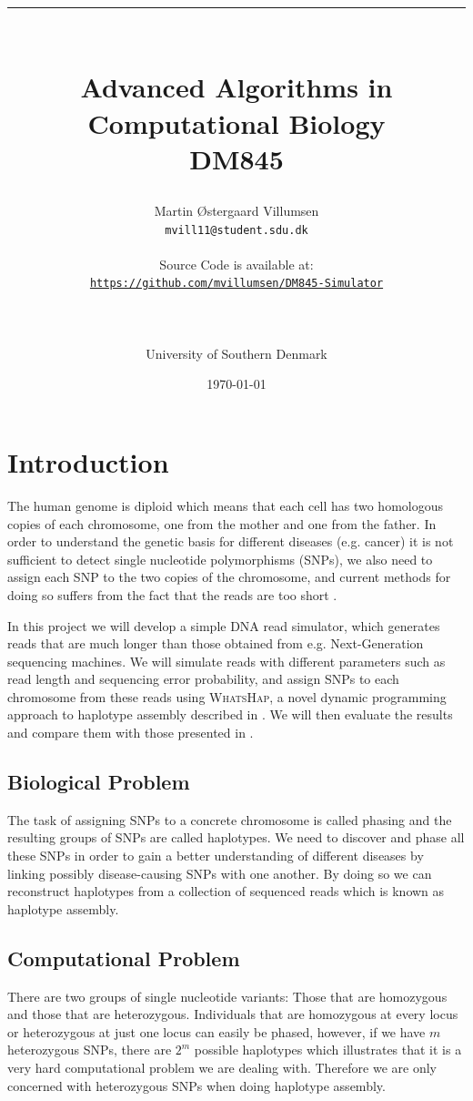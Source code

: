 \documentclass[10pt,a4paper]{article}
\title{\rule{12.5cm}{0.5mm}\\Advanced Algorithms in Computational Biology\\DM845}
\author{Martin Østergaard Villumsen\\\texttt{mvill11@student.sdu.dk}\\ \\ Source Code is available at:\\\texttt{\url{https://github.com/mvillumsen/DM845-Simulator}}\\\rule{6.5cm}{0.5mm}\\University of Southern Denmark\\}
\date{\today}
\begin{document}
\maketitle
\newpage
\tableofcontents
\newpage
\section{Introduction}
The human genome is diploid which means that each cell has two homologous copies of each chromosome, one from the mother and one from the father. In order to understand the genetic basis for different diseases (e.g. cancer) it is not sufficient to detect single nucleotide polymorphisms (SNPs), we also need to assign each SNP to the two copies of the chromosome, and current methods for doing so suffers from the fact that the reads are too short \cite{whatshap}.

In this project we will develop a simple DNA read simulator, which generates reads that are much longer than those obtained from e.g. Next-Generation sequencing machines. We will simulate reads with different parameters such as read length and sequencing error probability, and assign SNPs to each chromosome from these reads using \textsc{WhatsHap}, a novel dynamic programming approach to haplotype assembly described in \cite{whatshap}. We will then evaluate the results and compare them with those presented in \cite{whatshap}.

\subsection{Biological Problem}
The task of assigning SNPs to a concrete chromosome is called phasing and the resulting groups of SNPs are called haplotypes. We need to discover and phase all these SNPs in order to gain a better understanding of different diseases by linking possibly disease-causing SNPs with one another. By doing so we can reconstruct haplotypes from a collection of sequenced reads which is known as haplotype assembly.

\subsection{Computational Problem}
There are two groups of single nucleotide variants: Those that are homozygous and those that are heterozygous. Individuals that are homozygous at every locus or heterozygous at just one locus can easily be phased, however, if we have $m$ heterozygous SNPs, there are $2^m$ possible haplotypes which illustrates that it is a very hard computational problem we are dealing with. Therefore we are only concerned with heterozygous SNPs when doing haplotype assembly. 
\end{document}
